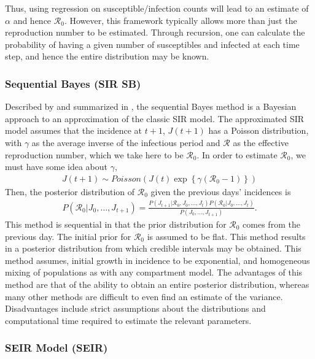 \documentclass[12pt]{article}
\newcommand{\rr}{\ensuremath{\mathcal{R}_0}}
\begin{document}
Thus, using regression on susceptible/infection counts will lead to an estimate of $\alpha$ and hence $\rr$.  However, this framework typically allows more than just the reproduction number to be estimated.  Through recursion, one can calculate the probability of having a given number of susceptibles and infected at each time step, and hence the entire distribution may be known.





\subsubsection{Sequential Bayes (SIR SB)}\label{sec:seqbayes}

Described by \cite{bettencourt2008} and summarized in \cite{obadia2012r0}, the sequential Bayes method is a Bayesian approach to an approximation of the classic SIR model.  The approximated SIR model assumes that the incidence at $t+1$, $J(t+1)$ has a Poisson distribution, with $\gamma$ as the  average inverse of the infectious period and $\mathcal{R}$ as the effective reproduction number, which we take here to be $\rr$. In order to estimate $\rr$, we must have some idea about $\gamma$,
\begin{align*}
J(t+1)  \sim Poisson( J(t) \exp \left \{  \gamma (\rr-1)\right \})
\end{align*}
Then, the posterior distribution of $\rr$ given the previous days' incidences is
\begin{align*}
  P(\rr | J_0, \dots, J_{t+1}) = \frac{P(J_{t+1} | \rr, J_0, \dots, J_t)P(\rr| J_0, \dots, J_t)}{P(J_0, \dots, J_{t+1})}.
\end{align*}
This method is sequential in that the prior distribution for $\rr$ comes from the previous day.  The initial prior for $\rr$ is assumed to be flat.  This method results in a posterior distribution from which credible intervals may be obtained.  This method assumes, initial growth in incidence to be exponential, and homogeneous mixing of populations as with any compartment model.  The advantages of this method are that of the ability to obtain an entire posterior distribution, whereas many other methods are difficult to even find an estimate of the variance.  Disadvantages include strict assumptions about the distributions and computational time required to estimate the relevant parameters. 




\subsubsection{SEIR Model (SEIR)}
\label{sec:seir-model}
\end{document}
